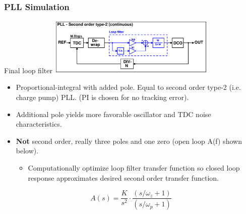 \documentclass[t, screen, aspectratio=43]{beamer}
\begin{document}
\begin{frame}
	\frametitle{PLL Simulation}
	\begin{block}{Final loop filter}
		\center\includegraphics[width=0.6\textwidth, angle=0]{pll_sec_order_type2.pdf}
		\begin{itemize}
			\scriptsize
			\item Proportional-integral with added pole. Equal to second order type-2 (i.e. charge pump) PLL. (PI is chosen for no tracking error).
			\item Additional pole yields more favorable oscillator and TDC noise characteristics.
			\item \textbf{Not} second order, really three poles and one zero (open loop A(f) shown below).
			\begin{itemize}
				\scriptsize
				\item Computationally optimize loop filter transfer function so closed loop response approximates desired second order transfer function.
			\end{itemize}		
		\end{itemize} 
		\scriptsize	
		\begin{equation}
			A(s) = \frac{K}{s^2}\cdot\frac{(s/\omega_z + 1)}{(s/\omega_p + 1)}
		\end{equation}
	\end{block}
\end{frame}
\end{document}
